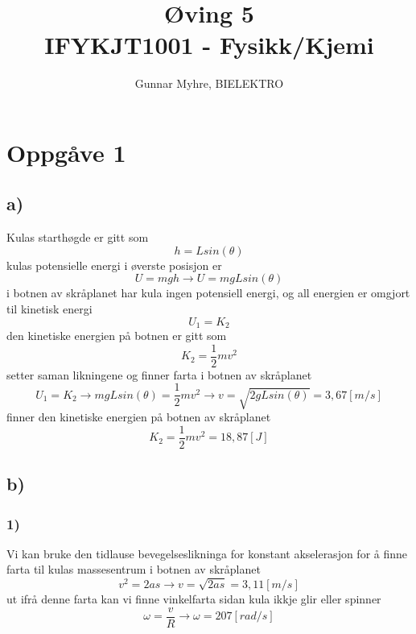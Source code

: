 \documentclass[12pt,a4paper]{article}
\title{%
  Øving 5 \\
  \large IFYKJT1001 - Fysikk/Kjemi \\
  }
\author{Gunnar Myhre, BIELEKTRO}
\begin{document}
  \maketitle

  \section*{Oppgåve 1}
    \subsection*{a)}
    Kulas starthøgde er gitt som
    \begin{equation}
      h=Lsin(\theta)
    \end{equation}
    kulas potensielle energi i øverste posisjon er
    \begin{equation}
      U=mgh\rightarrow U = mgLsin(\theta)
    \end{equation}
    i botnen av skråplanet har kula ingen potensiell energi, og all energien
    er omgjort til kinetisk energi
    \begin{equation}
      U_1 = K_2
    \end{equation}
    den kinetiske energien på botnen er gitt som
    \begin{equation}
      K_2 = \frac{1}{2}mv^2
    \end{equation}
    setter saman likningene og finner farta i botnen av skråplanet
    \begin{equation}
      U_1 = K_2 \rightarrow mgLsin(\theta) = \frac{1}{2}mv^2 \rightarrow
      v = \sqrt{2gLsin(\theta)} = 3,67[m/s]
    \end{equation}
    finner den kinetiske energien på botnen av skråplanet
    \begin{equation}
      K_2 = \frac{1}{2}mv^2 = 18,87[J]
    \end{equation}

    \subsection*{b)}
    \subsubsection*{1)}
    Vi kan bruke den tidlause bevegelseslikninga for konstant akselerasjon for å finne
    farta til kulas massesentrum i botnen av skråplanet
    \begin{equation}
      v^2 = 2as \rightarrow v = \sqrt{2as} = 3,11 [m/s]
    \end{equation}
    ut ifrå denne farta kan vi finne vinkelfarta sidan kula ikkje glir eller spinner
    \begin{equation}
      \omega = \frac{v}{R} \rightarrow \omega = 207 [rad/s]
    \end{equation}
\end{document}
